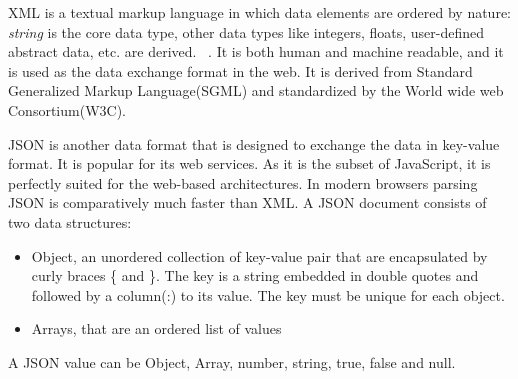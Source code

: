 XML is a textual markup language in which data elements are ordered by nature: \textit{string} is the core data type, other data types like integers, floats, user-defined abstract data, etc. are derived. ~\citep{xmark/original}. It is both human and machine readable, and it is used as the data exchange format in the web. It is derived from Standard Generalized Markup Language(SGML) and standardized by the World wide web Consortium(W3C).
\par
    JSON is another data format that is designed to exchange the data in key-value format. It is popular for its web services. As it is the subset of JavaScript, it is perfectly suited for the web-based architectures. In modern browsers parsing JSON is comparatively much faster than XML. A JSON document consists of two data structures:
\begin{itemize}
	\item Object, an unordered collection of key-value pair that are encapsulated by curly braces \{ and \}. The key is a string embedded in double quotes and followed by a column(:) to its value. The key must be unique for each object.
	\item Arrays, that are an ordered list of values
\end{itemize}
A JSON value can be Object, Array, number, string, true, false and null.
  
